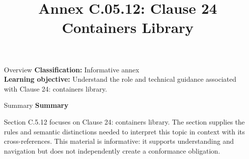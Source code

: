 \documentclass[10pt,letterpaper]{article}
\title{Annex C.05.12: Clause 24 Containers Library}
\author{}
\date{}
\begin{document}
\maketitle
\begin{CornellOverviewBox}{Overview}
\textbf{Classification:} Informative annex\\[2pt]
\textbf{Learning objective:} Understand the role and technical guidance associated with Clause 24: containers library.
\end{CornellOverviewBox}\begin{CornellSummaryBox}{Summary}
{\sffamily\bfseries\color{Accent} Summary}\par\vspace{3pt}Section C.5.12 focuses on Clause 24: containers library. The section supplies the rules and semantic distinctions needed to interpret this topic in context with its cross-references. This material is informative: it supports understanding and navigation but does not independently create a conformance obligation.
\end{CornellSummaryBox}
\end{document}

